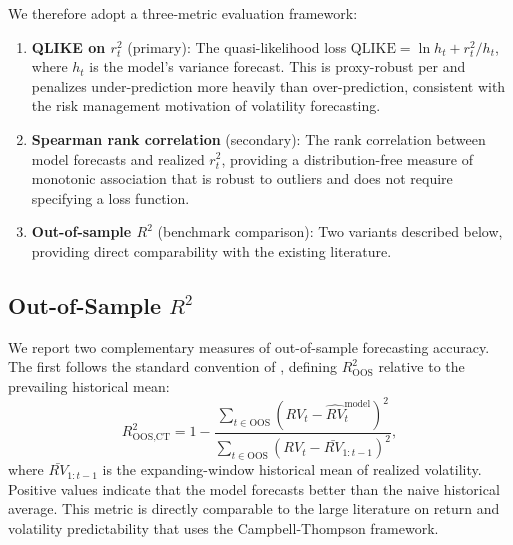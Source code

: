\documentclass[12pt,a4paper]{article}
\begin{document}
We therefore adopt a three-metric evaluation framework:

\begin{enumerate}
    \item \textbf{QLIKE on $r_t^2$} (primary): The quasi-likelihood loss $\text{QLIKE} = \ln h_t + r_t^2/h_t$, where $h_t$ is the model's variance forecast. This is proxy-robust per \citet{patton2011} and penalizes under-prediction more heavily than over-prediction, consistent with the risk management motivation of volatility forecasting.

    \item \textbf{Spearman rank correlation} (secondary): The rank correlation between model forecasts and realized $r_t^2$, providing a distribution-free measure of monotonic association that is robust to outliers and does not require specifying a loss function.

    \item \textbf{Out-of-sample $R^2$} (benchmark comparison): Two variants described below, providing direct comparability with the existing literature.
\end{enumerate}

\subsection{Out-of-Sample $R^2$}

We report two complementary measures of out-of-sample forecasting accuracy. The first follows the standard convention of \citet{campbell2008}, defining $R^2_{\text{OOS}}$ relative to the prevailing historical mean:
\begin{equation}
R^2_{\text{OOS,CT}} = 1 - \frac{\sum_{t \in \text{OOS}} (RV_t - \hat{RV}_t^{\text{model}})^2}{\sum_{t \in \text{OOS}} (RV_t - \bar{RV}_{1:t-1})^2},
\label{eq:oos_r2_ct}
\end{equation}
where $\bar{RV}_{1:t-1}$ is the expanding-window historical mean of realized volatility. Positive values indicate that the model forecasts better than the naive historical average. This metric is directly comparable to the large literature on return and volatility predictability that uses the Campbell-Thompson framework.
\end{document}

